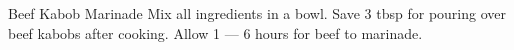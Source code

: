 \documentclass[../main.tex]{subfiles}
\begin{document}
\begin{recipe}{Beef Kabob Marinade}{}{}
    Mix all ingredients in a bowl. Save 3 tbsp for pouring over
    beef kabobs after cooking. Allow 1 --- 6 hours for beef to
    marinade.
\end{recipe}
\end{document}
